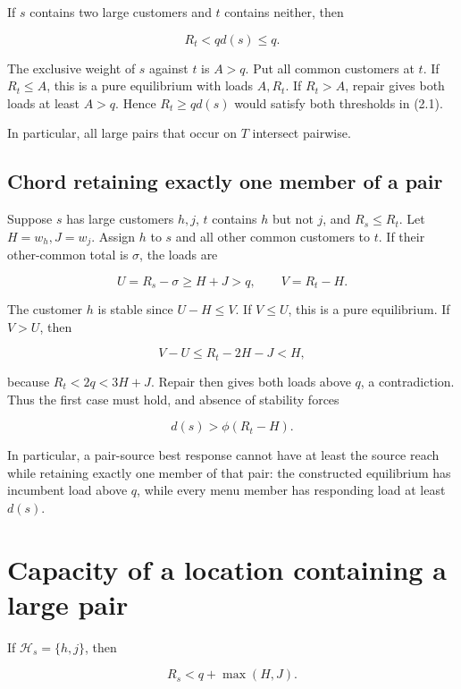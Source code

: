 \documentclass[11pt,a4paper]{article}
\begin{document}
If \(s\) contains two large customers and \(t\) contains neither, then

\[
R_t<qd(s)\le q. \tag{5.2}
\]

The exclusive weight of \(s\) against \(t\) is \(A>q\). Put all common customers at \(t\). If \(R_t\le A\), this is a pure equilibrium with loads \(A,R_t\). If \(R_t>A\), repair gives both loads at least \(A>q\). Hence \(R_t\ge qd(s)\) would satisfy both thresholds in (2.1).

In particular, all large pairs that occur on \(T\) intersect pairwise.

\hypertarget{chord-retaining-exactly-one-member-of-a-pair}{%
\subsection{Chord retaining exactly one member of a pair}\label{chord-retaining-exactly-one-member-of-a-pair}}

Suppose \(s\) has large customers \(h,j\), \(t\) contains \(h\) but not \(j\), and \(R_s\le R_t\). Let \(H=w_h,J=w_j\). Assign \(h\) to \(s\) and all other common customers to \(t\). If their other-common total is \(\sigma\), the loads are

\[
U=R_s-\sigma\ge H+J>q,\qquad V=R_t-H.
\]

The customer \(h\) is stable since \(U-H\le V\). If \(V\le U\), this is a pure equilibrium. If \(V>U\), then

\[
V-U\le R_t-2H-J<H,
\]

because \(R_t<2q<3H+J\). Repair then gives both loads above \(q\), a contradiction. Thus the first case must hold, and absence of stability forces

\[
d(s)>\phi(R_t-H). \tag{5.3}
\]

In particular, a pair-source best response cannot have at least the source reach while retaining exactly one member of that pair: the constructed equilibrium has incumbent load above \(q\), while every menu member has responding load at least \(d(s)\).

\hypertarget{capacity-of-a-location-containing-a-large-pair}{%
\section{Capacity of a location containing a large pair}\label{capacity-of-a-location-containing-a-large-pair}}

If \(\mathcal H_s=\{h,j\}\), then

\[
R_s<q+\max(H,J). \tag{6.1}
\]
\end{document}
